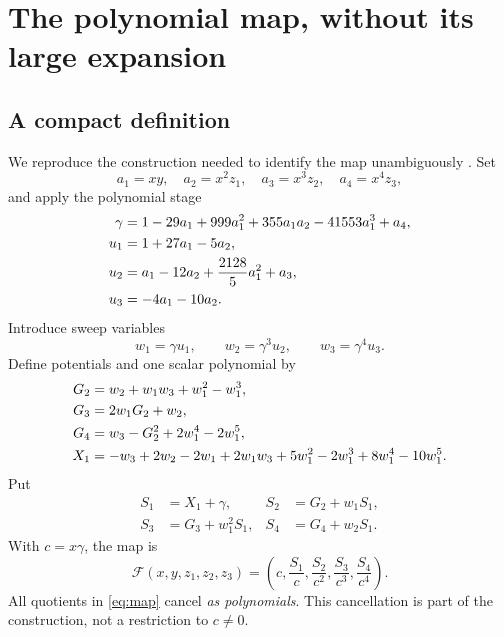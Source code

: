 \documentclass[11pt,a4paper]{article}
\theoremstyle{definition}
\newcommand{\F}{\mathcal F}
\begin{document}
\section{The polynomial map, without its large expansion}
\label{sec:map}

\subsection{A compact definition}
We reproduce the construction needed to identify the map unambiguously
\cite[\S4.5.1]{Gao}. Set
\[
 a_1=xy,\quad a_2=x^2z_1,\quad a_3=x^3z_2,\quad a_4=x^4z_3,
\]
and apply the polynomial stage
\begin{align}
 \gamma&=1-29a_1+999a_1^2+355a_1a_2-41553a_1^3+a_4,\notag\\
 u_1&=1+27a_1-5a_2,\label{eq:stage}\\
 u_2&=a_1-12a_2+\frac{2128}{5}a_1^2+a_3,\notag\\
 u_3&=-4a_1-10a_2.\notag
\end{align}
Introduce sweep variables
\[
 w_1=\gamma u_1,\qquad w_2=\gamma^3u_2,\qquad w_3=\gamma^4u_3.
\]
Define potentials and one scalar polynomial by
\begin{align}
 G_2&=w_2+w_1w_3+w_1^2-w_1^3,\notag\\
 G_3&=2w_1G_2+w_2,\notag\\
 G_4&=w_3-G_2^2+2w_1^4-2w_1^5,\label{eq:potentials}\\
 X_1&=-w_3+2w_2-2w_1+2w_1w_3+5w_1^2-2w_1^3
                +8w_1^4-10w_1^5.\notag
\end{align}
Put
\begin{align*}
 S_1&=X_1+\gamma,& S_2&=G_2+w_1S_1,\\
 S_3&=G_3+w_1^2S_1,& S_4&=G_4+w_2S_1.
\end{align*}
With $c=x\gamma$, the map is
\begin{equation}\label{eq:map}
 \F(x,y,z_1,z_2,z_3)=
 \left(c,\frac{S_1}{c},\frac{S_2}{c^2},\frac{S_3}{c^3},\frac{S_4}{c^4}\right).
\end{equation}
All quotients in \eqref{eq:map} cancel \emph{as polynomials}. This
cancellation is part of the construction, not a restriction to $c\ne0$.
\end{document}
